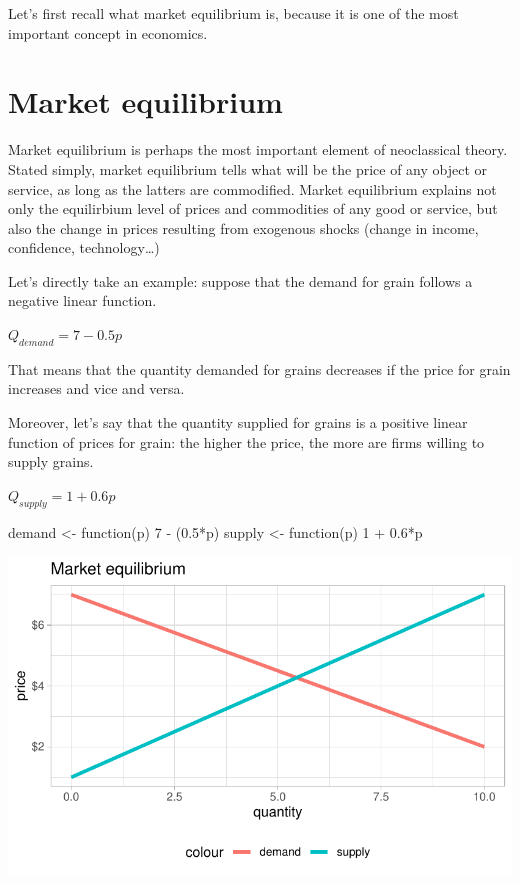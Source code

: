 \documentclass[
  letterpaper,
  DIV=11,
  numbers=noendperiod]{scrreprt}
\newenvironment{Shaded}{\begin{snugshade}}{\end{snugshade}}
\newcommand{\ControlFlowTok}[1]{\textcolor[rgb]{0.00,0.23,0.31}{#1}}
\newcommand{\DecValTok}[1]{\textcolor[rgb]{0.68,0.00,0.00}{#1}}
\newcommand{\FloatTok}[1]{\textcolor[rgb]{0.68,0.00,0.00}{#1}}
\newcommand{\NormalTok}[1]{\textcolor[rgb]{0.00,0.23,0.31}{#1}}
\newcommand{\OtherTok}[1]{\textcolor[rgb]{0.00,0.23,0.31}{#1}}
\newcommand{\SpecialCharTok}[1]{\textcolor[rgb]{0.37,0.37,0.37}{#1}}
\begin{document}
Let's first recall what market equilibrium is, because it is one of the
most important concept in economics.

\hypertarget{market-equilibrium}{%
\section{Market equilibrium}\label{market-equilibrium}}

Market equilibrium is perhaps the most important element of neoclassical
theory. Stated simply, market equilibrium tells what will be the price
of any object or service, as long as the latters are commodified. Market
equilibrium explains not only the equilirbium level of prices and
commodities of any good or service, but also the change in prices
resulting from exogenous shocks (change in income, confidence,
technology\ldots)

Let's directly take an example: suppose that the demand for grain
follows a negative linear function.

\(Q_{demand} = 7-0.5p\)

That means that the quantity demanded for grains decreases if the price
for grain increases and vice and versa.

Moreover, let's say that the quantity supplied for grains is a positive
linear function of prices for grain: the higher the price, the more are
firms willing to supply grains.

\(Q_{supply} = 1+0.6p\)

\begin{Shaded}
\begin{Highlighting}[]
\NormalTok{demand }\OtherTok{\textless{}{-}} \ControlFlowTok{function}\NormalTok{(p) }\DecValTok{7} \SpecialCharTok{{-}}\NormalTok{ (}\FloatTok{0.5}\SpecialCharTok{*}\NormalTok{p)}
\NormalTok{supply }\OtherTok{\textless{}{-}} \ControlFlowTok{function}\NormalTok{(p) }\DecValTok{1} \SpecialCharTok{+} \FloatTok{0.6}\SpecialCharTok{*}\NormalTok{p}
\end{Highlighting}
\end{Shaded}

\includegraphics{intro_files/figure-pdf/unnamed-chunk-3-1.pdf}
\end{document}
